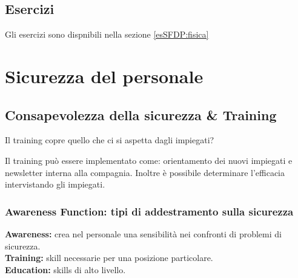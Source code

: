 \subsection{Esercizi}

Gli esercizi sono dispnibili nella sezione \ref{esSFDP:fisica}

\section{Sicurezza del personale}

\subsection{Consapevolezza della sicurezza \& Training}

Il training copre quello che ci si aspetta dagli impiegati?

Il training può essere implementato come: orientamento dei nuovi impiegati e
newsletter interna alla compagnia. Inoltre è possibile determinare l'efficacia
intervistando gli impiegati.


\subsubsection{Awareness Function: tipi di addestramento sulla sicurezza}

\textbf{Awareness:} crea nel personale una sensibilità nei confronti di problemi di
sicurezza.\\
\newline
\textbf{Training:} skill necessarie per una posizione particolare.\\
\newline
\textbf{Education:} skills di alto livello.\\
